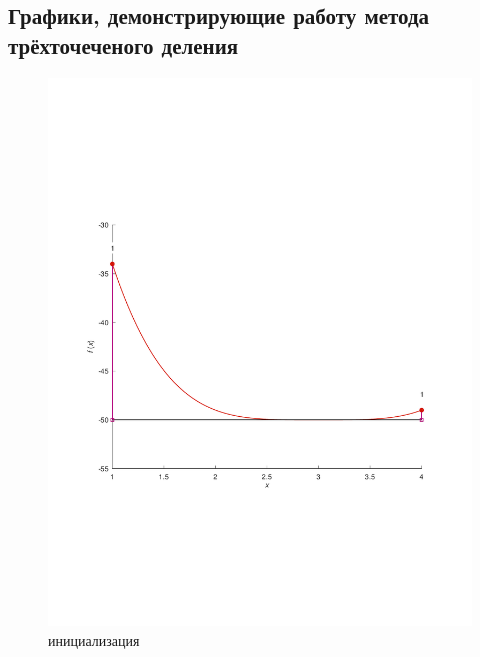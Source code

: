 \documentclass[a4paper,12pt]{article}
\begin{document}
\subsection*{Графики, демонстрирующие работу метода трёхточеченого деления}
    \begin{figure}[H]
        \centering
        \includegraphics[scale=0.4]{0Bolcanoitter.pdf}
        \caption{инициализация}
    \end{figure}
\end{document}
